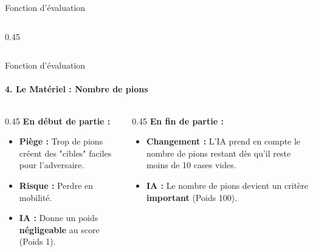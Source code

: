 \documentclass[10pt, aspectratio=169]{beamer}
\begin{document}
\begin{frame}{Fonction d'évaluation}
\begin{columns}[t]
\begin{column}{0.45\textwidth}
        \end{column}
    \end{columns}
\end{frame}

\begin{frame}{Fonction d'évaluation}
    \framesubtitle{4. Le Matériel : Nombre de pions}

    \begin{columns}[T]
        \begin{column}{0.45\textwidth}
            \textbf{En début de partie :}
            \vspace{0.2cm}
            \begin{itemize}
                \item \textbf{Piège :} Trop de pions créent des "cibles" faciles pour l'adversaire.
                \item \textbf{Risque :} Perdre en mobilité.
                \item \textbf{IA :} Donne un poids \textbf{négligeable} au score (Poids 1).
            \end{itemize}
        \end{column}

        \begin{column}{0.45\textwidth}
            \textbf{En fin de partie :}
            \vspace{0.2cm}
            \begin{itemize}
                \item \textbf{Changement :} L'IA prend en compte le nombre de pions restant dès qu'il reste moins de 10 cases vides.
                \item \textbf{IA :} Le nombre de pions devient un critère \textbf{important} (Poids 100).
            \end{itemize}
        \end{column}
    \end{columns}

    \vspace{0.8cm}


\end{frame}
\end{document}
